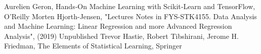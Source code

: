 \begin{thebibliography}{99}
Aurelien Geron, Hands‑On Machine Learning with Scikit‑Learn and TensorFlow, O'Reilly
Morten Hjorth-Jensen, "Lectures Notes in FYS-STK4155. Data Analysis and Machine Learning: Linear Regression and more Advanced Regression Analysis", (2019)
Unpublished
Trevor Hastie, Robert Tibshirani, Jerome H. Friedman, The Elements of Statistical Learning, Springer
\end{thebibliography}